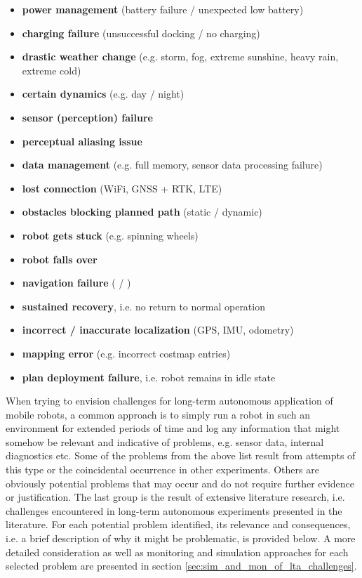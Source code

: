 \documentclass[english, master, utf8]{base/thesis_KBS}
\newcommand{\code}{\collectverb{\codebox}}
\begin{document}
\begin{itemize}
    \item \textbf{power management} (battery failure / unexpected low battery)
    \item \textbf{charging failure} (unsuccessful docking / no charging)
    \item \textbf{drastic weather change} (e.g. storm, fog, extreme sunshine, heavy rain, extreme cold)
    \item \textbf{certain dynamics} (e.g. day / night)
    \item \textbf{sensor (perception) failure}
    \item \textbf{perceptual aliasing issue}
    \item \textbf{data management} (e.g. full memory, sensor data processing failure)
    \item \textbf{lost connection} (WiFi, GNSS + RTK, LTE)
    \item \textbf{obstacles blocking planned path} (static / dynamic)
    \item \textbf{robot gets stuck} (e.g. spinning wheels)
    \item \textbf{robot falls over}
    \item \textbf{navigation failure} (\code{move_base_flex} / \code{pdc})
    \item \textbf{sustained recovery}, i.e. no return to normal operation
    \item \textbf{incorrect / inaccurate localization} (GPS, IMU, odometry)
    \item \textbf{mapping error} (e.g. incorrect costmap entries)
    \item \textbf{plan deployment failure}, i.e. robot remains in idle state
\end{itemize}
When trying to envision challenges for long-term autonomous application of mobile robots, a common approach is to simply run a robot in such an environment for extended periods
of time and log any information that might somehow be relevant and indicative of problems, e.g. sensor data, internal diagnostics etc. \cite{Biswas:2016}
Some of the problems from the above list result from attempts of this type or the coincidental occurrence in other experiments. Others are obviously potential problems that may occur
and do not require further evidence or justification. The last group is the result of extensive literature research, i.e. challenges encountered in long-term autonomous experiments
presented in the literature. For each potential problem identified, its relevance and consequences, i.e. a brief description of why it might be problematic, is provided below.
A more detailed consideration as well as monitoring and simulation approaches for each selected problem are presented in section \ref{sec:sim_and_mon_of_lta_challenges}.
\end{document}
